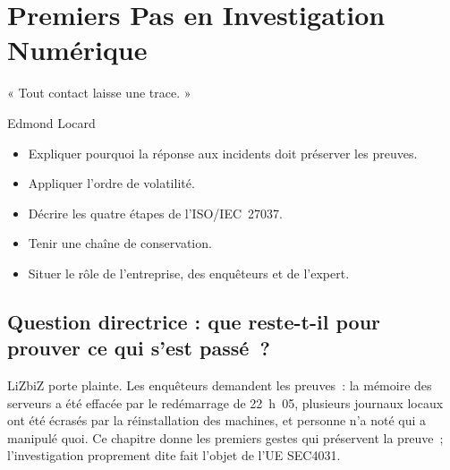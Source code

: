 
\chapter{Premiers Pas en Investigation Numérique}
\label{chap:investigation}

\epigraph{%
    « Tout contact laisse une trace. »%
}{Edmond Locard}


\begin{boxobjectifs}
\begin{itemize}
    \item Expliquer pourquoi la réponse aux incidents doit préserver les
          preuves.
    \item Appliquer l'ordre de volatilité.
    \item Décrire les quatre étapes de l'ISO/IEC~27037.
    \item Tenir une chaîne de conservation.
    \item Situer le rôle de l'entreprise, des enquêteurs et de l'expert.
\end{itemize}
\end{boxobjectifs}

\bigskip

\section*{Question directrice : que reste-t-il pour prouver ce qui s'est passé~?}

LiZbiZ porte plainte. Les enquêteurs demandent les preuves~: la mémoire
des serveurs a été effacée par le redémarrage de 22~h~05, plusieurs
journaux locaux ont été écrasés par la réinstallation des machines, et
personne n'a noté qui a manipulé quoi. Ce chapitre donne les premiers
gestes qui préservent la preuve~; l'investigation proprement dite fait
l'objet de l'UE SEC4031.

